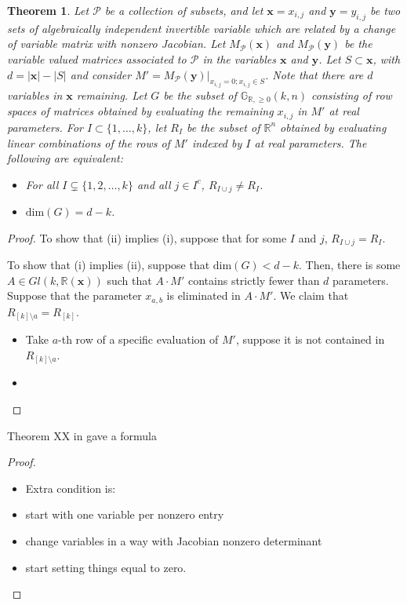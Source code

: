 \documentclass[11pt]{article}
\newcommand{\R}{\mathbb{R}}
\newcommand{\Gr}{\mathbb{G}_{\R, \geq 0}}
\newtheorem{thm}{Theorem}[section]
\theoremstyle{remark}
\theoremstyle{definition}
\begin{document}
\begin{appendices}
\begin{thm}
Let $\mathcal{P}$ be a collection of subsets, and let $\mathbf{x} = x_{i,j}$ and $\mathbf{y} = y_{i,j}$ be two sets of algebraically independent invertible variable which are related by a change of variable matrix with nonzero Jacobian. Let $M_{\mathcal{P}}(\mathbf{x})$ and $M_{\mathcal{P}}(\mathbf{y})$ be the variable valued matrices associated to $\mathcal{P}$ in the variables $\mathbf{x}$ and $\mathbf{y}$. Let $S \subset \mathbf{x}$, with $d = |\mathbf{x}| - |S|$ and consider $M' = M_{\mathcal{P}}(\mathbf{y})|_{x_{i,j} = 0; x_{i,j} \in S}$. Note that there are $d$ variables in $\mathbf{x}$ remaining. Let $G$ be the subset of $\Gr(k,n)$ consisting of row spaces of matrices obtained by evaluating the remaining $x_{i,j}$ in $M'$ at real parameters. For $I \subset \{1, \dots, k\}$, let $R_I$ be the subset of $\mathbb{R}^n$ obtained by evaluating linear combinations of the rows of $M'$ indexed by $I$ at real parameters. The following are equivalent:
\begin{itemize}
\item[(i)] For all $I \subsetneq \{1,2, \dots, k\}$ and all $j \in I^c$, $R_{I \cup j} \neq R_I$.
\item[(ii)] $\mathrm{dim}(G) = d-k$.
\end{itemize}
\end{thm}

\begin{proof}
To show that (ii) implies (i), suppose that for some $I$ and $j$, $R_{I \cup j} = R_{I}$.

To show that (i) implies (ii), suppose that $\mathrm{dim}(G) < d-k$. Then, there is some $A \in Gl(k,\mathbb{R}(\mathbf{x}))$ such that $A \cdot M'$ contains strictly fewer than $d$ parameters. Suppose that the parameter $x_{a,b}$ is eliminated in $A \cdot M'$. We claim that $R_{[k] \setminus a} = R_{[k]}$.

\begin{itemize}
\item Take $a$-th row of a specific evaluation of $M'$, suppose it is not contained in $R_{[k] \setminus a}$.
\item
\end{itemize}
\end{proof}

Theorem XX in \cite{basisshapeloce} gave a formula
\begin{proof}
\begin{itemize}
\item Extra condition is:
\item start with one variable per nonzero entry
\item change variables in a way with Jacobian nonzero determinant
\item start setting things equal to zero.
\end{itemize}
\end{proof}


\end{appendices}
\end{document}
